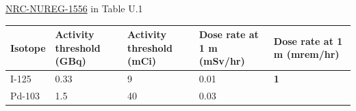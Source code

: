 \documentclass[]{book}
\theoremstyle{definition}
\theoremstyle{definition}
\theoremstyle{definition}
\theoremstyle{remark}
\begin{document}
\href{https://www.nrc.gov/reading-rm/doc-collections/nuregs/staff/sr1556/}{NRC-NUREG-1556}
in Table U.1

\begin{longtable}[]{@{}lllll@{}}
\toprule
\begin{minipage}[b]{0.13\columnwidth}\raggedright\strut
Isotope\strut
\end{minipage} & \begin{minipage}[b]{0.13\columnwidth}\raggedright\strut
Activity threshold (GBq)\strut
\end{minipage} & \begin{minipage}[b]{0.13\columnwidth}\raggedright\strut
Activity threshold (mCi)\strut
\end{minipage} & \begin{minipage}[b]{0.13\columnwidth}\raggedright\strut
Dose rate at 1 m (mSv/hr)\strut
\end{minipage} & \begin{minipage}[b]{0.13\columnwidth}\raggedright\strut
Dose rate at 1 m (mrem/hr)\strut
\end{minipage}\tabularnewline
\midrule
\endhead
\begin{minipage}[t]{0.13\columnwidth}\raggedright\strut
I-125\strut
\end{minipage} & \begin{minipage}[t]{0.13\columnwidth}\raggedright\strut
0.33\strut
\end{minipage} & \begin{minipage}[t]{0.13\columnwidth}\raggedright\strut
9\strut
\end{minipage} & \begin{minipage}[t]{0.13\columnwidth}\raggedright\strut
0.01\strut
\end{minipage} & \begin{minipage}[t]{0.13\columnwidth}\raggedright\strut
\textbf{1}\strut
\end{minipage}\tabularnewline
\begin{minipage}[t]{0.13\columnwidth}\raggedright\strut
Pd-103\strut
\end{minipage} & \begin{minipage}[t]{0.13\columnwidth}\raggedright\strut
1.5\strut
\end{minipage} & \begin{minipage}[t]{0.13\columnwidth}\raggedright\strut
40\strut
\end{minipage} & \begin{minipage}[t]{0.13\columnwidth}\raggedright\strut
0.03\strut
\end{minipage} & \begin{minipage}[t]{0.13\columnwidth}\raggedright\strut

\end{minipage}
\end{longtable}
\end{document}
